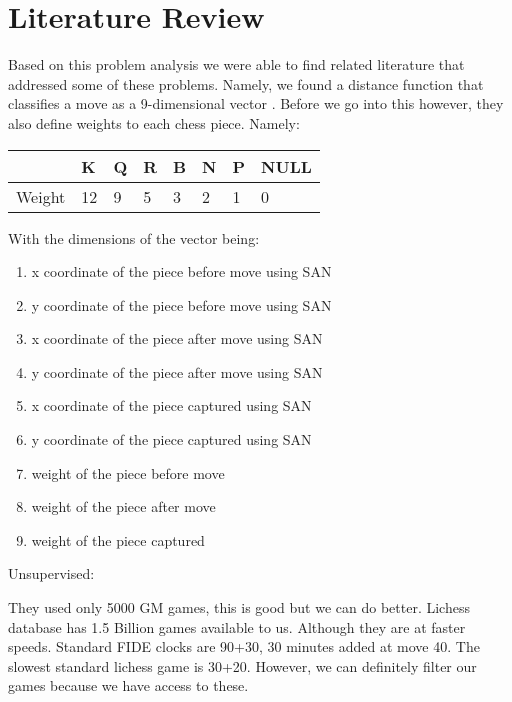 \documentclass[12pt]{article}
\begin{document}
    \section{Literature Review}

    Based on this problem analysis we were able to find related literature that addressed some of these problems. Namely, we found a distance function that classifies a move as a 9-dimensional vector \cite{main}. Before we go into this however, they also define weights to each chess piece. Namely: 

    \begin{table}[ht]
        \begin{tabular}{|l|l|l|l|l|l|l|l|}
        \hline
            & K  & Q & R & B & N & P & NULL \\ \hline
        Weight & 12 & 9 & 5 & 3 & 2 & 1 & 0    \\ \hline
        \end{tabular}
    \end{table}

    With the dimensions of the vector being: 

    \begin{enumerate}
        \item x coordinate of the piece before move using SAN 
        \item y coordinate of the piece before move using SAN 
        \item x coordinate of the piece after move using SAN 
        \item y coordinate of the piece after move using SAN 
        \item x coordinate of the piece captured using SAN 
        \item y coordinate of the piece captured using SAN 
        \item weight of the piece before move 
        \item weight of the piece after move 
        \item weight of the piece captured
    \end{enumerate}

    Unsupervised:

        They used only 5000 GM games, this is good but we can do better. Lichess database has 1.5 Billion games available to us. Although they are at faster speeds. Standard FIDE clocks are 90+30, 30 minutes added at move 40. The slowest standard lichess game is 30+20. However, we can definitely filter our games because we have access to these. 
\end{document}
